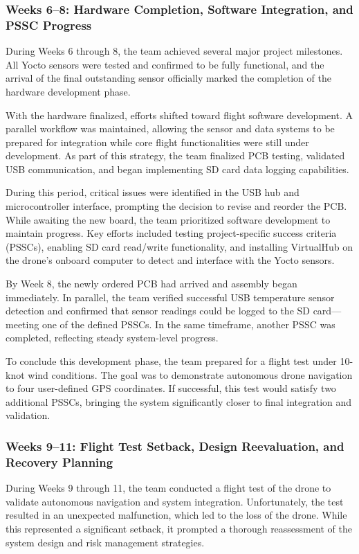 \documentclass[12pt]{article}
\begin{document}
\subsubsection*{Weeks 6–8: Hardware Completion, Software Integration, and PSSC Progress}

During Weeks 6 through 8, the team achieved several major project milestones. All Yocto sensors were tested and confirmed to be fully functional, and the arrival of the final outstanding sensor officially marked the completion of the hardware development phase.

With the hardware finalized, efforts shifted toward flight software development. A parallel workflow was maintained, allowing the sensor and data systems to be prepared for integration while core flight functionalities were still under development. As part of this strategy, the team finalized PCB testing, validated USB communication, and began implementing SD card data logging capabilities.

During this period, critical issues were identified in the USB hub and microcontroller interface, prompting the decision to revise and reorder the PCB. While awaiting the new board, the team prioritized software development to maintain progress. Key efforts included testing project-specific success criteria (PSSCs), enabling SD card read/write functionality, and installing VirtualHub on the drone's onboard computer to detect and interface with the Yocto sensors.

By Week 8, the newly ordered PCB had arrived and assembly began immediately. In parallel, the team verified successful USB temperature sensor detection and confirmed that sensor readings could be logged to the SD card—meeting one of the defined PSSCs. In the same timeframe, another PSSC was completed, reflecting steady system-level progress.

To conclude this development phase, the team prepared for a flight test under 10-knot wind conditions. The goal was to demonstrate autonomous drone navigation to four user-defined GPS coordinates. If successful, this test would satisfy two additional PSSCs, bringing the system significantly closer to final integration and validation.

\subsubsection*{Weeks 9–11: Flight Test Setback, Design Reevaluation, and Recovery Planning}

During Weeks 9 through 11, the team conducted a flight test of the drone to validate autonomous navigation and system integration. Unfortunately, the test resulted in an unexpected malfunction, which led to the loss of the drone. While this represented a significant setback, it prompted a thorough reassessment of the system design and risk management strategies.
\end{document}
